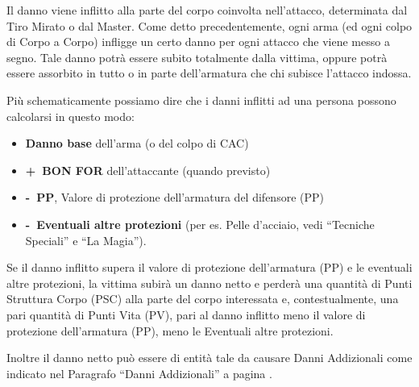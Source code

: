Il danno viene inflitto alla parte del corpo coinvolta nell'attacco,
determinata dal Tiro Mirato o dal Master. Come detto precedentemente,
ogni arma (ed ogni colpo di Corpo a Corpo) infligge un certo danno per
ogni attacco che viene messo a segno. Tale danno potr\`a essere subito
totalmente dalla vittima, oppure potr\`a essere assorbito in tutto o
in parte dell'armatura che chi subisce l'attacco indossa.

Pi\`u schematicamente possiamo dire che i danni
inflitti ad una persona possono calcolarsi in questo modo: 

\begin{itemize}
  \itemsep -6pt
\item \textbf{Danno base} dell'arma (o del colpo di CAC)
\item \textbf{+\ BON FOR} dell'attaccante (quando previsto)
\item \textbf{-\ PP}, Valore di protezione dell'armatura del difensore (PP)
\item \textbf{-\ Eventuali altre protezioni} (per es. Pelle d'acciaio, 
  vedi ``Tecniche Speciali'' e ``La Magia'').
\end{itemize}

Se il danno inflitto supera il valore di protezione dell'armatura (PP)
e le eventuali altre protezioni, la vittima subir\`a un danno netto e
perder\`a una quantit\`a di Punti Struttura Corpo (PSC) alla parte del
corpo interessata e, contestualmente, una pari quantit\`a di Punti
Vita (PV), pari al danno inflitto meno il valore di protezione
dell'armatura (PP), meno le Eventuali altre protezioni.

Inoltre il danno netto pu\`o essere di entit\`a tale da causare
Danni Addizionali come indicato nel Paragrafo ``Danni Addizionali'' a
pagina \pageref{danniaddizionali}.


